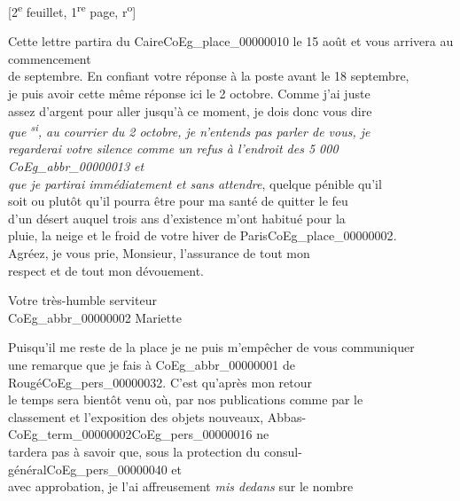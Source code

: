 \documentclass{book}
\begin{document}
{\footnotesize\begin{center} {[2\textsuperscript{e} feuillet, 1\textsuperscript{re} page, r\textsuperscript{o}]}\end{center}}
\noindent Cette lettre partira du Caire\gls{CoEg_place_00000010} le 15 août et vous arrivera au commencement\\
de septembre. En confiant votre réponse à la poste avant le 18 septembre,\\
je puis avoir cette même réponse ici le 2 octobre. Comme j’ai juste\\
assez d’argent pour aller jusqu’à ce moment, je dois donc vous dire\\
\textit{que \textsuperscript{si}, au courrier du 2 octobre, je n’entends pas parler de vous, je\\
regarderai votre silence comme un refus à l’endroit des 5 000 \gls{CoEg_abbr_00000013} et\\
que je partirai immédiatement et sans attendre}, quelque pénible qu’il\\
soit ou plutôt qu’il pourra être pour ma santé de quitter le feu\\
d’un désert auquel trois ans d’existence m’ont habitué pour la\\
pluie, la neige et le froid de votre hiver de Paris\gls{CoEg_place_00000002}.\\
\indent Agréez, je vous prie, Monsieur, l’assurance de tout mon\\
respect et de tout mon dévouement.
\begin{center}\hspace{5cm} Votre très-humble serviteur\\
\hspace{5cm} \gls{CoEg_abbr_00000002} Mariette\end{center}
\indent Puisqu’il me reste de la place je ne puis m’empêcher de vous communiquer\\
une remarque que je fais à \gls{CoEg_abbr_00000001} de Rougé\gls{CoEg_pers_00000032}. C’est qu’après mon retour\\
le temps sera bientôt venu où, par nos publications comme par le\\
classement et l’exposition des objets nouveaux, Abbas-\Gls{CoEg_term_00000002}\gls{CoEg_pers_00000016} ne\\
tardera pas à savoir que, sous la protection du consul-général\gls{CoEg_pers_00000040} et\\
avec approbation, je l’ai affreusement \textit{mis dedans} sur le nombre\\
\end{document}
